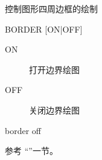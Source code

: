 \label{cmd:border}

控制图形四周边框的绘制

\begin{SACSTX}
BORDER [ON|OFF]
\end{SACSTX}

\begin{description}
\item [ON] 打开边界绘图
\item [OFF] 关闭边界绘图
\end{description}

\begin{SACDFT}
border off
\end{SACDFT}

参考 ``''一节。
